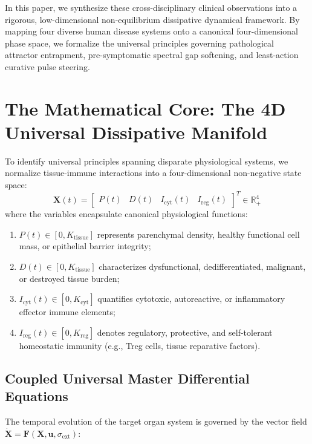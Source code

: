 \documentclass[11pt,a4paper]{article}
\begin{document}
In this paper, we synthesize these cross-disciplinary clinical observations into a rigorous, low-dimensional non-equilibrium dissipative dynamical framework. By mapping four diverse human disease systems onto a canonical four-dimensional phase space, we formalize the universal principles governing pathological attractor entrapment, pre-symptomatic spectral gap softening, and least-action curative pulse steering.

\section{The Mathematical Core: The 4D Universal Dissipative Manifold}

To identify universal principles spanning disparate physiological systems, we normalize tissue-immune interactions into a four-dimensional non-negative state space:
\begin{equation}
\bm{X}(t) = \begin{bmatrix} P(t) & D(t) & I_{\mathrm{cyt}}(t) & I_{\mathrm{reg}}(t) \end{bmatrix}^T \in \mathbb{R}_+^4
\end{equation}
where the variables encapsulate canonical physiological functions:
\begin{enumerate}
    \item $P(t) \in [0, K_{\mathrm{tissue}}]$ represents parenchymal density, healthy functional cell mass, or epithelial barrier integrity;
    \item $D(t) \in [0, K_{\mathrm{tissue}}]$ characterizes dysfunctional, dedifferentiated, malignant, or destroyed tissue burden;
    \item $I_{\mathrm{cyt}}(t) \in [0, K_{\mathrm{cyt}}]$ quantifies cytotoxic, autoreactive, or inflammatory effector immune elements;
    \item $I_{\mathrm{reg}}(t) \in [0, K_{\mathrm{reg}}]$ denotes regulatory, protective, and self-tolerant homeostatic immunity (e.g., Treg cells, tissue reparative factors).
\end{enumerate}

\subsection{Coupled Universal Master Differential Equations}

The temporal evolution of the target organ system is governed by the vector field $\dot{\bm{X}} = \bm{F}(\bm{X}, \bm{u}, \sigma_{\mathrm{ext}})$:
\end{document}
